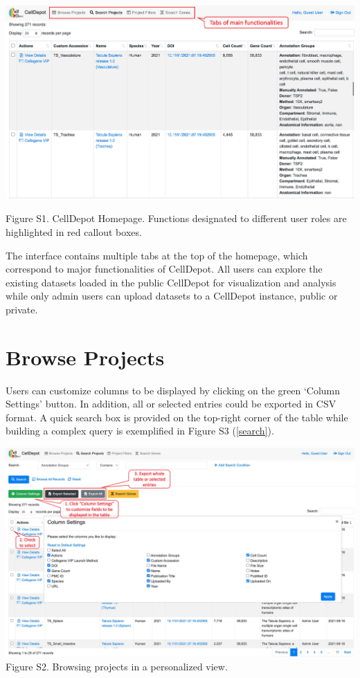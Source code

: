 \documentclass[runningheads]{llncs}
\begin{document}
\href{figures/S1.jpg}{\includegraphics{figures/S1.jpg}}

Figure S1. CellDepot Homepage. Functions designated to different user roles are highlighted in red callout boxes.

The interface contains multiple tabs at the top of the homepage, which correspond to major functionalities of CellDepot. All users can explore the existing datasets loaded in the public CellDepot for visualization and analysis while only admin users can upload datasets to a CellDepot instance, public or private.

\hypertarget{browse-projects}{%
\section{Browse Projects}\label{browse-projects}}

Users can customize columns to be displayed by clicking on the green `Column Settings' button. In addition, all or selected entries could be exported in CSV format. A quick search box is provided on the top-right corner of the table while building a complex query is exemplified in Figure S3 (\ref{search}).

\href{figures/S2.jpg}{\includegraphics{figures/S2.jpg}}
Figure S2. Browsing projects in a personalized view.
\end{document}
